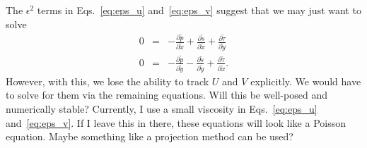 \documentclass[12pt]{article}
\newcommand{\p}{\partial}
\newcommand{\xT}{\tilde{x}}
\newcommand{\yT}{\tilde{y}}
\newcommand{\pT}{\tilde{p}}
\newcommand{\sT}{\tilde{s}}
\newcommand{\tauT}{\tilde{\tau}}
\newcommand{\prxT}[1]{\frac{\p #1}{\p \xT}}
\newcommand{\pryT}[1]{\frac{\p #1}{\p \yT}}
\begin{document}
The $\epsilon^2$ terms in Eqs.~\ref{eq:eps_u} and~\ref{eq:eps_v} suggest that
we may just want to solve
\begin{eqnarray}
  0&=&-\prxT{\pT}+\prxT{\sT}+\pryT{\tauT} \\
  0&=&-\pryT{\pT}-\pryT{\sT}+\prxT{\tauT}.
\end{eqnarray}
However, with this, we lose the ability to track $U$ and $V$ explicitly. We would
have to solve for them via the remaining equations. Will this be well-posed
and numerically stable? Currently, I use a small viscosity in Eqs.~\ref{eq:eps_u}
and~\ref{eq:eps_v}. If I leave this in there, these equations will look like
a Poisson equation. Maybe something like a projection method can be used?
\end{document}
